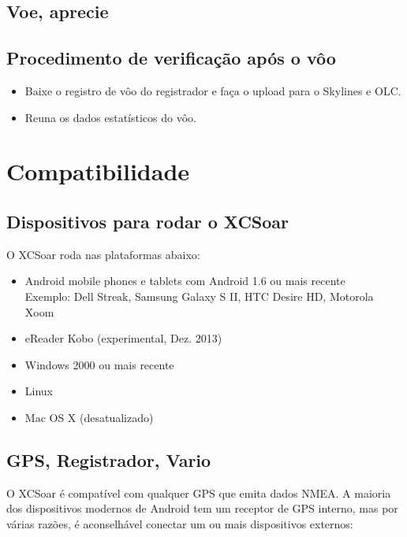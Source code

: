 \subsection*{Voe, aprecie}
\vspace{4em}

\subsection*{Procedimento de verificação após o vôo}
\begin{itemize}
\item Baixe o registro de vôo do registrador e faça o upload para o Skylines e OLC.
\item Reuna os dados estatísticos do vôo.
\end{itemize}
\newpage




\section{Compatibilidade}

\subsection*{Dispositivos para rodar o XCSoar}

O XCSoar roda nas plataformas abaixo:

\begin{itemize}
\item Android mobile phones e tablets com Android 1.6 ou mais recente \\
  Exemplo: Dell Streak, Samsung Galaxy S II, HTC Desire HD,
  Motorola Xoom
\item eReader Kobo (experimental, Dez. 2013)
\item Windows 2000 ou mais recente
\item Linux
\item Mac OS X (desatualizado)
\end{itemize}

\subsection*{GPS, Registrador, Vario}

O XCSoar é compatível com qualquer GPS que emita dados NMEA.  A maioria dos dispositivos modernos de Android tem um receptor de GPS interno, mas por várias razões, é aconselhável conectar um ou mais dispositivos externos:

